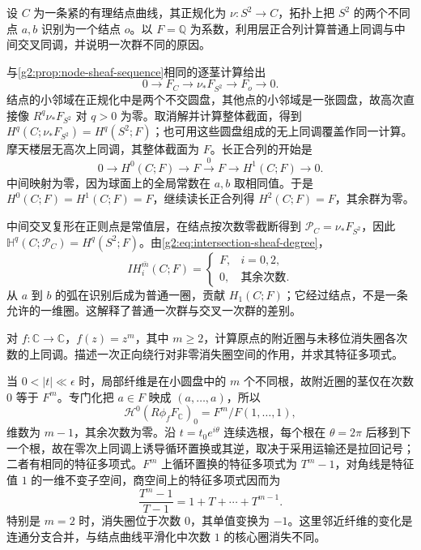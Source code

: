 \begin{exercise}\label{g2:ex:nodal-curve-cohomology}
	设 \(C\) 为一条紧的有理结点曲线，其正规化为 \(\nu:S^2\to C\)，拓扑上把 \(S^2\) 的两个不同点 \(a,b\) 识别为一个结点 \(o\)。以 \(F=\mathbb Q\) 为系数，利用层正合列计算普通上同调与中间交叉同调，并说明一次群不同的原因。
\end{exercise}
\begin{solution}
	与\cref{g2:prop:node-sheaf-sequence}相同的逐茎计算给出
	\[
		0\longrightarrow F_C\longrightarrow\nu_*F_{S^2}\longrightarrow F_o\longrightarrow0.
	\]
	结点的小邻域在正规化中是两个不交圆盘，其他点的小邻域是一张圆盘，故高次直接像 \(R^q\nu_*F_{S^2}\) 对 \(q>0\) 为零。取消解并计算整体截面，得到 \(H^q(C;\nu_*F_{S^2})=H^q(S^2;F)\)；也可用这些圆盘组成的无上同调覆盖作同一计算。摩天楼层无高次上同调，其整体截面为 \(F\)。长正合列的开始是
	\[
		0\longrightarrow H^0(C;F)\longrightarrow F
		\xrightarrow{\;0\;}F\longrightarrow H^1(C;F)\longrightarrow0.
	\]
	中间映射为零，因为球面上的全局常数在 \(a,b\) 取相同值。于是 \(H^0(C;F)=H^1(C;F)=F\)，继续读长正合列得 \(H^2(C;F)=F\)，其余群为零。

	中间交叉复形在正则点是常值层，在结点按次数零截断得到 \(\mathcal P_C=\nu_*F_{S^2}\)，因此 \(\mathbb H^q(C;\mathcal P_C)=H^q(S^2;F)\)。由\cref{g2:eq:intersection-sheaf-degree}，
	\[
		IH_i^{\bar m}(C;F)=\begin{cases}F,&i=0,2,\\0,&\text{其余次数}.\end{cases}
	\]
	从 \(a\) 到 \(b\) 的弧在识别后成为普通一圈，贡献 \(H_1(C;F)\)；它经过结点，不是一条允许的一维圈。这解释了普通一次群与交叉一次群的差别。
\end{solution}

\begin{exercise}\label{g2:ex:power-vanishing-cycles}
	对 \(f:\mathbb C\to\mathbb C\)，\(f(z)=z^m\)，其中 \(m\geq2\)，计算原点的附近圈与未移位消失圈各次数的上同调。描述一次正向绕行对非零消失圈空间的作用，并求其特征多项式。
\end{exercise}
\begin{solution}
	当 \(0<|t|\ll\epsilon\) 时，局部纤维是在小圆盘中的 \(m\) 个不同根，故附近圈的茎仅在次数 \(0\) 等于 \(F^m\)。专门化把 \(a\in F\) 映成 \((a,\ldots,a)\)，所以
	\[
		\mathcal H^0(R\phi_fF_{\mathbb C})_0=F^m/F(1,\ldots,1),
	\]
	维数为 \(m-1\)，其余次数为零。沿 \(t=t_0e^{i\theta}\) 连续选根，每个根在 \(\theta=2\pi\) 后移到下一个根，故在零次上同调上诱导循环置换或其逆，取决于采用运输还是拉回记号；二者有相同的特征多项式。\(F^m\) 上循环置换的特征多项式为 \(T^m-1\)，对角线是特征值 \(1\) 的一维不变子空间，商空间上的特征多项式因而为
	\[
		\frac{T^m-1}{T-1}=1+T+\cdots+T^{m-1}.
	\]
	特别是 \(m=2\) 时，消失圈位于次数 \(0\)，其单值变换为 \(-1\)。这里邻近纤维的变化是连通分支合并，与结点曲线平滑化中次数 \(1\) 的核心圈消失不同。
\end{solution}

